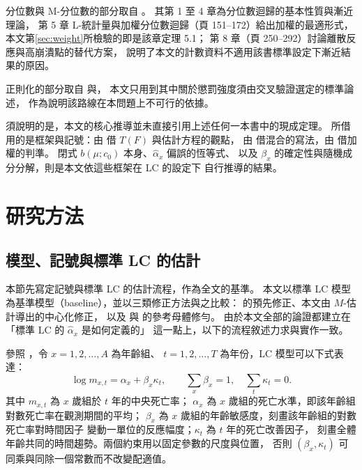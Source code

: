 \documentclass[UTF8, fontset=macnew, a4paper, 12pt]{ctexart}
\begin{document}
分位數與 M-分位數的部分取自 \citet{koenker2005}。
其第 1 至 4 章為分位數迴歸的基本性質與漸近理論，
第 5 章 L-統計量與加權分位數迴歸（頁 151--172）給出加權的最適形式，
本文第\ref{sec:weight}所檢驗的即是該章定理 5.1；
第 8 章（頁 250--292）討論離散反應與高崩潰點的替代方案，
說明了本文的計數資料不適用該書標準設定下漸近結果的原因。

正則化的部分取自 \citet{buhlmann2011} 與\citet{hastie2015}，
本文只用到其中關於懲罰強度須由交叉驗證選定的標準論述，
作為說明該路線在本問題上不可行的依據。

須說明的是，本文的核心推導並未直接引用上述任何一本書中的現成定理。
所借用的是框架與記號：由 \citet{zoubir2018} 借 $T(F)$ 與估計方程的觀點，
由 \citet{yao2024} 借混合的寫法，由 \citet{koenker2005} 借加權的判準。
閉式 $b(\mu;c_0)$ 本身、$\hat\alpha_x$ 偏誤的恆等式、
以及 $\beta_x$ 的確定性與隨機成分分解，則是本文依這些框架在 LC 的設定下
自行推導的結果。
\section{研究方法}\label{sec:method}

\subsection{模型、記號與標準 LC 的估計}

本節先寫定記號與標準 LC 的估計流程，作為全文的基準。
本文以標準 LC 模型為基準模型（baseline），並以三類修正方法與之比較：
\citet{firth1993}的預先修正、本文由 $M$-估計導出的中心化修正，
以及 \citet{lee2003}與 \citet{yue2019}的參考母體修勻。
由於本文全部的論證都建立在「標準 LC 的 $\hat\alpha_x$ 是如何定義的」
這一點上，以下的流程敘述力求與實作一致。

參照 \citet{lee1992}，令 $x=1,2,\dots,A$ 為年齡組、
$t=1,2,\dots,T$ 為年份，LC 模型可以下式表達：
\begin{equation}\label{eq:lc}
\log m_{x,t}=\alpha_x+\beta_x\kappa_t,\qquad
\sum_x\beta_x=1,\quad \sum_t\kappa_t=0 .
\end{equation}
其中 $m_{x,t}$ 為 $x$ 歲組於 $t$ 年的中央死亡率；
$\alpha_x$ 為 $x$ 歲組的死亡水準，即該年齡組對數死亡率在觀測期間的平均；
$\beta_x$ 為 $x$ 歲組的年齡敏感度，刻畫該年齡組的對數死亡率對時間因子
變動一單位的反應幅度；$\kappa_t$ 為 $t$ 年的死亡改善因子，
刻畫全體年齡共同的時間趨勢。兩個約束用以固定參數的尺度與位置，
否則 $(\beta_x,\kappa_t)$ 可同乘與同除一個常數而不改變配適值。
\end{document}
